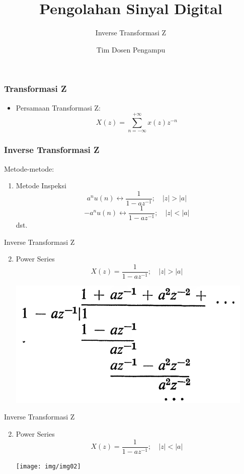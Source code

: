 \documentclass[pdflatex,compress,mathserif]{beamer}
\title{Pengolahan Sinyal Digital}
\subtitle{Inverse Transformasi Z}
\author{Tim Dosen Pengampu}
\begin{document}
\maketitle

\begin{frame}
	\frametitle{Transformasi Z}
	\begin{itemize}
		\item Persamaan Transformasi Z:
		\begin{equation}
			X(z) = \sum\limits_{n=-\infty}^{+\infty} x(z)z^{-n}
		\end{equation}
	\end{itemize}
\end{frame}

\begin{frame}
	\frametitle{Inverse Transformasi Z}
	Metode-metode:
	\begin{enumerate}
		\item Metode Inspeksi
		\begin{equation}
			a^nu(n) \leftrightarrow \frac{1}{1-az^{-1}};\quad|z|>|a|
		\end{equation}
		\begin{equation}
			-a^nu(n) \leftrightarrow \frac{1}{1-az^{-1}};\quad|z|<|a|
		\end{equation}
		dst.
	\end{enumerate}
\end{frame}

\begin{frame}{Inverse Transformasi Z}
	\begin{enumerate}
		\setcounter{enumi}{1}
		\item Power Series
		\begin{equation*}
			X(z)= \frac{1}{1-az^{-1}};\quad|z|>|a|
		\end{equation*}
		\begin{center}
			\includegraphics[width=0.6\linewidth]{img/img01}
		\end{center}
	\end{enumerate}
\end{frame}

\begin{frame}{Inverse Transformasi Z}
	\begin{enumerate}
		\setcounter{enumi}{1}
		\item Power Series
		\begin{equation*}
		X(z)= \frac{1}{1-az^{-1}};\quad|z|<|a|
		\end{equation*}
		\begin{center}
			\texttt{[image: img/img02]}
		\end{center}
	\end{enumerate}
\end{frame}
\end{document}
